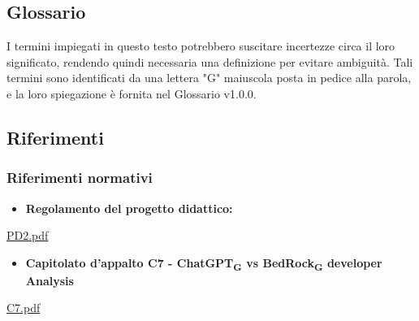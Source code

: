 \documentclass{article}
\begin{document}
\subsection{Glossario}
I termini impiegati in questo testo potrebbero suscitare incertezze circa il loro significato, rendendo quindi necessaria una definizione per evitare ambiguità. Tali termini sono identificati da una lettera "G" maiuscola posta in pedice alla parola, e la loro spiegazione è fornita nel Glossario v1.0.0.

\subsection{Riferimenti}

\subsubsection{Riferimenti normativi}
\begin{itemize}
    \item \textbf{Regolamento del progetto didattico:}
\end{itemize}
\href{https://www.math.unipd.it/~tullio/IS-1/2023/Dispense/PD2.pdf}{PD2.pdf}
\begin{itemize}
    \item \textbf{Capitolato d'appalto C7 - ChatGPT\textsubscript{G} vs BedRock\textsubscript{G} developer Analysis}
\end{itemize}
\href{https://www.math.unipd.it/~tullio/IS-1/2023/Progetto/C7.pdf}{C7.pdf}
\end{document}
